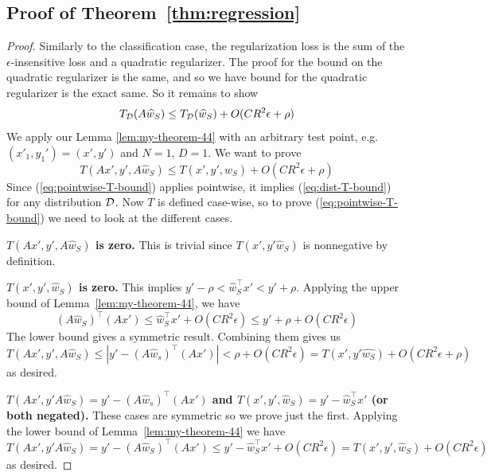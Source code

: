 \documentclass[english]{article}
\theoremstyle{plain}
\begin{document}
\subsection{Proof of Theorem~\ref{thm:regression}}
\label{app:regression-theorem-proof}
\begin{proof}
Similarly to the classification case, the regularization loss is the
sum of the $\epsilon$-insensitive loss and a quadratic regularizer.
The proof for the bound on the quadratic regularizer is the same,
and so we have bound for the quadratic regularizer is the exact same.
So it remains to show
\begin{equation}
T_{{\cal D}}(A\widehat{w}_{S})\leq T_{{\cal D}}(\widehat{w}_{S})+O(CR^{2}\epsilon+\rho)\label{eq:dist-T-bound}
\end{equation}
We apply our Lemma \ref{lem:my-theorem-44} with an arbitrary
test point, e.g. $(x'_{1},y_{1}')=(x',y')$ and $N=1$, $D=1$. We
want to prove
\begin{equation}
T(Ax',y',A\widehat{w}_{S})\leq T(x',y',\widehat{w}_{S})+O(CR^{2}\epsilon+\rho)\label{eq:pointwise-T-bound}
\end{equation}
Since (\ref{eq:pointwise-T-bound}) applies pointwise, it implies
(\ref{eq:dist-T-bound}) for any distribution ${\cal D}$. Now $T$
is defined case-wise, so to prove (\ref{eq:pointwise-T-bound}) we
need to look at the different cases.

\textbf{$T(Ax',y',A\widehat{w}_{S})$ is zero.} This is trivial since
$T(x',y'\widehat{w}_{S})$ is nonnegative by definition.

\textbf{$T(x',y',\widehat{w}_{S})$ is zero.} This implies $y'-\rho<\widehat{w}_{S}^{\top}x'<y'+\rho$.
Applying the upper bound of Lemma~\ref{lem:my-theorem-44},
we have
\[
\left(A\widehat{w}_{S}\right)^{\top}\left(Ax'\right)\leq\widehat{w}_{S}^{\top}x'+O(CR^{2}\epsilon)\leq y'+\rho+O(CR^{2}\epsilon)
\]
The lower bound gives a symmetric result. Combining them gives us
\[
T(Ax',y',A\widehat{w}_{S})\leq\left|y'-\left(A\widehat{w}_{s}\right)^{\top}\left(Ax'\right)\right|<\rho+O(CR^{2}\epsilon)=T(x',y'\widehat{w_{S}})+O(CR^{2}\epsilon+\rho)
\]
as desired.

\textbf{$T(Ax',y'A\widehat{w}_{S})=y'-\left(A\widehat{w}_{s}\right)^{\top}\left(Ax'\right)$
and $T(x',y',\widehat{w}_{S})=y'-\widehat{w}_{S}^{\top}x'$ (or both
negated).} These cases are symmetric so we prove just the first. Applying
the lower bound of Lemma~\ref{lem:my-theorem-44} we have
\[
T(Ax',y'A\widehat{w}_{S})=y'-\left(A\widehat{w}_{S}\right)^{\top}\left(Ax'\right)\leq y'-\widehat{w}_{S}^{\top}x'+O(CR^{2}\epsilon)=T(x',y',\widehat{w}_{S})+O(CR^{2}\epsilon)
\]
as desired.


\end{proof}
\end{document}
